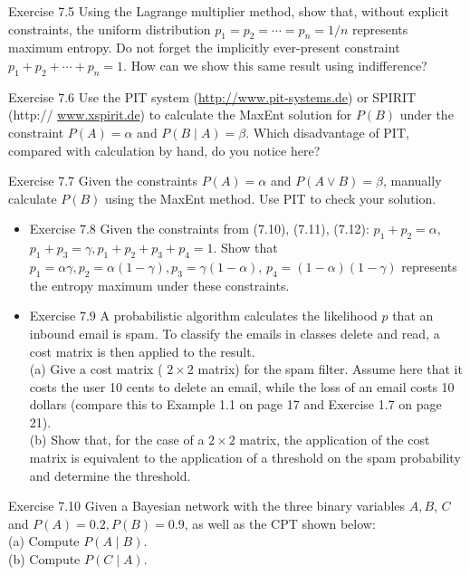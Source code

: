 \documentclass[10pt]{article}
\begin{document}
Exercise 7.5 Using the Lagrange multiplier method, show that, without explicit constraints, the uniform distribution $p_{1}=p_{2}=\cdots=p_{n}=1 / n$ represents maximum entropy. Do not forget the implicitly ever-present constraint $p_{1}+p_{2}+\cdots+p_{n}=1$. How can we show this same result using indifference?

Exercise 7.6 Use the PIT system (\href{http://www.pit-systems.de}{http://www.pit-systems.de}) or SPIRIT (http:// \href{http://www.xspirit.de}{www.xspirit.de}) to calculate the MaxEnt solution for $P(B)$ under the constraint $P(A)=\alpha$ and $P(B \mid A)=\beta$. Which disadvantage of PIT, compared with calculation by hand, do you notice here?

Exercise 7.7 Given the constraints $P(A)=\alpha$ and $P(A \vee B)=\beta$, manually calculate $P(B)$ using the MaxEnt method. Use PIT to check your solution.

\begin{itemize}
  \item Exercise 7.8 Given the constraints from (7.10), (7.11), (7.12): $p_{1}+p_{2}=\alpha$, $p_{1}+p_{3}=\gamma, p_{1}+p_{2}+p_{3}+p_{4}=1$. Show that $p_{1}=\alpha \gamma, p_{2}=\alpha(1-\gamma), p_{3}=\gamma(1-\alpha)$, $p_{4}=(1-\alpha)(1-\gamma)$ represents the entropy maximum under these constraints.
  \item Exercise 7.9 A probabilistic algorithm calculates the likelihood $p$ that an inbound email is spam. To classify the emails in classes delete and read, a cost matrix is then applied to the result.\\

(a) Give a cost matrix ( $2 \times 2$ matrix) for the spam filter. Assume here that it costs the user 10 cents to delete an email, while the loss of an email costs 10 dollars (compare this to Example 1.1 on page 17 and Exercise 1.7 on page 21).\\
(b) Show that, for the case of a $2 \times 2$ matrix, the application of the cost matrix is equivalent to the application of a threshold on the spam probability and determine the threshold.
\end{itemize}

Exercise 7.10 Given a Bayesian network with the three binary variables $A, B$, $C$ and $P(A)=0.2, P(B)=0.9$, as well as the CPT shown below:\\
(a) Compute $P(A \mid B)$.\\
(b) Compute $P(C \mid A)$.
\end{document}
